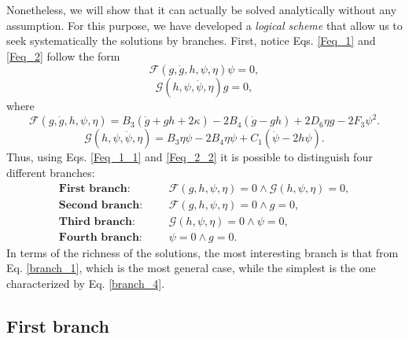 Nonetheless, we will show that it can actually be solved analytically without any assumption. For this purpose,
we have developed a \textit{logical scheme} that allow us to seek systematically the solutions by branches. First, notice Eqs. \eqref{Feq_1} 
and \eqref{Feq_2} follow the form
\begin{dmath}
    \label{Feq_1_1}
    \mathcal{F}(g, \dot{g}, h,\psi,\eta)\psi = 0,
\end{dmath}
\begin{dmath}
    \label{Feq_2_2}
    \mathcal{G}(h,\psi, \dot{\psi}, \eta)g = 0,
\end{dmath}
where
\begin{dmath}
\mathcal{F}(g,\dot{g},h,\psi,\eta)  = B_3\left(\dot{g} + gh + 2\kappa\right) - 2B_4\left(\dot{g} - gh\right) + 2D_6\eta g - 2F_3\psi^2.
\end{dmath}
\begin{dmath}
\mathcal{G}(h,\psi, \dot{\psi}, \eta) = B_3\eta\psi -2B_4\eta\psi + C_1\left(\dot{\psi} - 2h\psi\right).
\end{dmath}
Thus, using Eqs. \eqref{Feq_1_1} and \eqref{Feq_2_2} it is possible to distinguish four different branches:
\begin{align}
    \textbf{First branch:}  &&& \mathcal{F}(g,h,\psi,\eta) \! = 0 \! \wedge \! \mathcal{G}(h,\psi,\eta) \!= \! 0,  \label{branch_1}\\
    \textbf{Second branch:} &&& \mathcal{F}(g,h,\psi,\eta)  = 0  \wedge  g  = 0, \label{branch_2}\\
    \textbf{Third branch:}  &&& \mathcal{G}(h,\psi,\eta)   = 0   \wedge  \psi  = 0, \label{branch_3}\\
    \textbf{Fourth branch:} &&& \psi  = 0  \wedge  g  = 0. \label{branch_4}
\end{align}
In terms of the richness of the solutions, the most interesting branch is that from Eq. \eqref{branch_1},
which is the most general case, while the simplest is the one characterized by Eq. \eqref{branch_4}.

\subsection{First branch}
\label{sec:first_branch}

